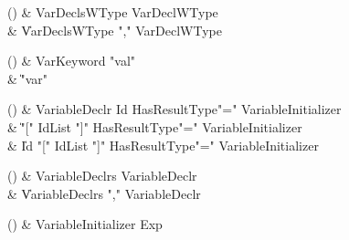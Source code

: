 \begin{bbgrammarappendix}{3.7in}

() & VarDeclsWType \label{prod:VarDeclsWType}  \: VarDeclWType  \\

 &    \| VarDeclsWType \xcd"," VarDeclWType \\

\end{bbgrammarappendix}

\begin{bbgrammarappendix}{4.0in}

() & VarKeyword \label{prod:VarKeyword}  \: \xcd"val"  \\

 &    \| \xcd"var" \\

\end{bbgrammarappendix}

\begin{bbgrammarappendix}{3.7in}

() & VariableDeclr \label{prod:VariableDeclr}  \: Id HasResultType\opt \xcd"=" VariableInitializer  \\

 &    \| \xcd"[" IdList \xcd"]" HasResultType\opt \xcd"=" VariableInitializer \\
 &    \| Id \xcd"[" IdList \xcd"]" HasResultType\opt \xcd"=" VariableInitializer \\

\end{bbgrammarappendix}

\begin{bbgrammarappendix}{3.6in}

() & VariableDeclrs \label{prod:VariableDeclrs}  \: VariableDeclr  \\

 &    \| VariableDeclrs \xcd"," VariableDeclr \\

\end{bbgrammarappendix}

\begin{bbgrammarappendix}{3.1in}

() & VariableInitializer \label{prod:VariableInitializer}  \: Exp  \\


\end{bbgrammarappendix}

